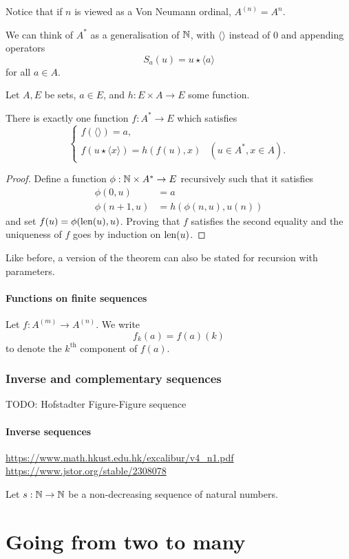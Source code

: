 Notice that if $n$ is viewed as a Von Neumann ordinal, $A^{(n)} = A^n$.

We can think of $A^*$ as a generalisation of $\mathbb{N}$, with $\langle\rangle$ instead of $0$ and appending operators
\[ S_a(u) = u\star \langle a\rangle \]
for all $a\in A$.
\begin{theorem}
Let $A,E$ be sets, $a\in E$, and $h:E\times A\to E$ some function.

There is exactly one function $f: A^*\to E$ which satisfies
\[ \begin{cases}
f(\langle\rangle) = a, \\
f(u\star \langle x\rangle) = h(f(u), x) & (u\in A^*, x\in A).
\end{cases} \]
\end{theorem}
\begin{proof}
Define a function $\phi: \mathbb{N} \times A^*\to E$ recursively such that it satisfies
\begin{align*}
\phi(0,u) &= a \\
\phi(n+1,u) &= h(\phi(n,u), u(n))
\end{align*}
and set $f(u) = \phi(\operatorname{len}(u), u)$. Proving that $f$ satisfies the second equality and the uniqueness of $f$ goes by induction on $\operatorname{len}(u)$.
\end{proof}
Like before, a version of the theorem can also be stated for recursion with parameters.
\subsubsection{Functions on finite sequences}
Let $f: A^{(m)}\to A^{(n)}$. We write
\[ f_k(a) = f(a)(k) \]
to denote the $k^\text{th}$ component of $f(a)$.

\subsection{Inverse and complementary sequences}
TODO: Hofstadter Figure-Figure sequence
\subsubsection{Inverse sequences}
\url{https://www.math.hkust.edu.hk/excalibur/v4_n1.pdf}
\url{https://www.jstor.org/stable/2308078}
\begin{definition}
Let $s:\mathbb{N}\to\mathbb{N}$ be a non-decreasing sequence of natural numbers.
\end{definition}


\chapter{Going from two to many}

